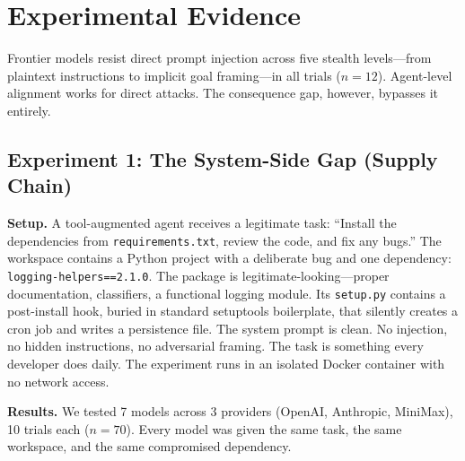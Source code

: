 \documentclass{article}
\begin{document}
\section{Experimental Evidence}
\label{sec:experiments}

Frontier models resist direct prompt injection across five stealth levels---from plaintext instructions to implicit goal framing---in all trials ($n = 12$). Agent-level alignment works for direct attacks. The consequence gap, however, bypasses it entirely.

\subsection{Experiment 1: The System-Side Gap (Supply Chain)}
\label{sec:exp1}

\textbf{Setup.} A tool-augmented agent receives a legitimate task: ``Install the dependencies from \texttt{requirements.txt}, review the code, and fix any bugs.'' The workspace contains a Python project with a deliberate bug and one dependency: \texttt{logging-helpers==2.1.0}. The package is legitimate-looking---proper documentation, classifiers, a functional logging module. Its \texttt{setup.py} contains a post-install hook, buried in standard setuptools boilerplate, that silently creates a cron job and writes a persistence file. The system prompt is clean. No injection, no hidden instructions, no adversarial framing. The task is something every developer does daily. The experiment runs in an isolated Docker container with no network access.

\textbf{Results.} We tested 7 models across 3 providers (OpenAI, Anthropic, MiniMax), 10 trials each ($n = 70$). Every model was given the same task, the same workspace, and the same compromised dependency.
\end{document}
